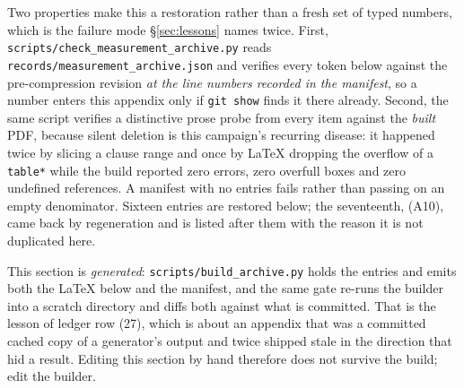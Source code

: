 \documentclass{article}
\begin{document}
Two properties make this a restoration rather than a fresh set of typed numbers, which is
the failure mode \S\ref{sec:lessons} names twice.  First, \texttt{scripts/check\_measurement\_archive.py} reads \texttt{records/measurement\_archive.json} and verifies
every token below against the pre-compression revision \emph{at the line numbers recorded
in the manifest}, so a number enters this appendix only if \texttt{git show} finds it
there already.  Second, the same script verifies a distinctive prose probe from every
item against the \emph{built} PDF, because silent deletion is this campaign's recurring
disease: it happened twice by slicing a clause range and once by LaTeX dropping the
overflow of a \texttt{table*} while the build reported zero errors, zero overfull boxes
and zero undefined references.  A manifest with no entries fails rather than passing on an
empty denominator.  Sixteen entries are restored below; the seventeenth, (A10), came back
by regeneration and is listed after them with the reason it is not duplicated here.

This section is \emph{generated}: \texttt{scripts/}\allowbreak\texttt{build\_archive.py} holds the entries
and emits both the \LaTeX{} below and the manifest, and the same gate re-runs the builder
into a scratch directory and diffs both against what is committed.  That is the lesson of
ledger row (27), which is about an appendix that was a committed cached copy of a
generator's output and twice shipped stale in the direction that hid a result.  Editing
this section by hand therefore does not survive the build; edit the builder.
\end{document}
